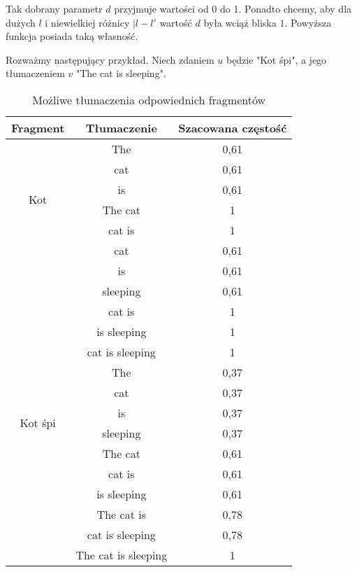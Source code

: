 \documentclass[12pt]{article}
\begin{document}
Tak dobrany parametr $d$ przyjmuje wartości od 0 do 1. Ponadto chcemy, aby dla dużych $l$ i niewielkiej różnicy $|l-l'$ wartość $d$ była wciąż bliska $1$. Powyższa funkcja posiada taką własność.

Rozważmy następujący przykład. Niech zdaniem $u$ będzie "Kot śpi", a jego tłumaczeniem $v$ "The cat is sleeping".

\begin{table}[H]
    \centering
    \begin{tabular}{| c | c | c |}
    \hline   Fragment & Tłumaczenie & Szacowana częstość\\
    \hline   \multirow{6}{*}{Kot} & The & 0,61\\ \cline{2-3}
                                & cat & 0,61 \\ \cline{2-3}
                                & is & 0,61\\ \cline{2-3}
                                & The cat & 1 \\ \cline{2-3}
                                & cat is & 1 \\ \cline{2-3}
    \hline   \multirow{6}{*}{śpi} & cat & 0,61\\ \cline{2-3}
                            & is & 0,61 \\ \cline{2-3}
                            & sleeping & 0,61\\ \cline{2-3}
                            & cat is & 1 \\ \cline{2-3}
                            & is sleeping & 1 \\ \cline{2-3}
                            & cat is sleeping & 1 \\ \cline{2-3}
    \hline   \multirow{6}{*}{Kot śpi} & The & 0,37\\ \cline{2-3}
                        & cat & 0,37 \\ \cline{2-3}
                        & is & 0,37\\ \cline{2-3}
                        & sleeping & 0,37 \\ \cline{2-3}
                        & The cat & 0,61 \\ \cline{2-3}
                        & cat is & 0,61 \\ \cline{2-3}
                        & is sleeping& 0,61 \\ \cline{2-3}
                        & The cat is & 0,78\\ \cline{2-3}
                        & cat is sleeping & 0,78 \\ \cline{2-3}
                        & The cat is sleeping& 1 \\ \cline{2-3}
    \hline
    \end{tabular}
    \caption{Możliwe tłumaczenia odpowiednich fragmentów}
    \label{tab:my_label}
\end{table}
\end{document}
